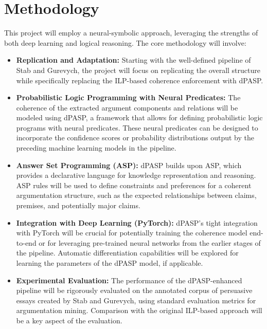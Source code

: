 \documentclass{article}
\begin{document}
\section{Methodology}

This project will employ a neural-symbolic approach, leveraging the strengths of
both deep learning and logical reasoning. The core methodology will involve:

\begin{itemize}
    \item \textbf{Replication and Adaptation:} Starting with the well-defined
    pipeline of Stab and Gurevych, the project will focus on replicating the
    overall structure while specifically replacing the ILP-based coherence
    enforcement with dPASP.
    
    \item \textbf{Probabilistic Logic Programming with Neural Predicates:} The
    coherence of the extracted argument components and relations will be modeled
     using dPASP, a framework that allows for defining probabilistic logic
     programs with neural predicates. These neural predicates can be designed to
     incorporate the confidence scores or probability distributions output by
     the preceding machine learning models in the pipeline.
    
    \item \textbf{Answer Set Programming (ASP):} dPASP builds upon ASP, which
    provides a declarative language for knowledge representation and reasoning.
    ASP rules will be used to define constraints and preferences for a coherent
    argumentation structure, such as the expected relationships between claims,
    premises, and potentially major claims.
    
    \item \textbf{Integration with Deep Learning (PyTorch):} dPASP's tight
    integration with PyTorch will be crucial for potentially training the
    coherence model end-to-end or for leveraging pre-trained neural networks
    from the earlier stages of the pipeline. Automatic differentiation
    capabilities will be explored for learning the parameters of the dPASP
    model, if applicable.
    
    \item \textbf{Experimental Evaluation:} The performance of the 
    dPASP-enhanced pipeline will be rigorously evaluated on the annotated corpus
    of persuasive essays created by Stab and Gurevych, using standard evaluation
    metrics for argumentation mining. Comparison with the original ILP-based
    approach will be a key aspect of the evaluation.
\end{itemize}
\end{document}

